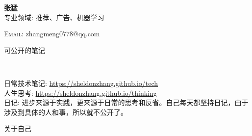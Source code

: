 \documentclass[20pt,a4paper]{article}
\newenvironment{changemargin}[2]{%
  \begin{list}{}{%
    \setlength{\topsep}{0pt}%
    \setlength{\leftmargin}{#1}%
    \setlength{\rightmargin}{#2}%
    \setlength{\listparindent}{\parindent}%
    \setlength{\itemindent}{\parindent}%
    \setlength{\parsep}{\parskip}%
  }%
  \item[]}{\end{list}
}
\newcommand{\lineover}{
	\begin{changemargin}{-0.05in}{-0.05in}
		\vspace*{-8pt}
		\hrulefill \\
		\vspace*{-2pt}
	\end{changemargin}
}
\newcommand{\header}[1]{
	\begin{changemargin}{-0.5in}{-0.5in}
		\scshape{#1}\\
  	\lineover
	\end{changemargin}
}
\newcommand{\contact}[4]{
	\begin{changemargin}{-0.5in}{-0.5in}
		\begin{center}
			{\large \scshape {#1}}\\ %
			{#2}\\ %
			{#3}\\ %
			{#4}%
		\end{center}
	\end{changemargin}
}
\newenvironment{body} {
	\vspace*{-16pt}
	\begin{changemargin}{-0.25in}{-0.5in}
  }	
	{\end{changemargin}
}
\begin{document}
\begin{minipage}[t]{0.5\textwidth}
\textbf{张猛} \\
\hfill 专业领域: 推荐、广告、机器学习\\
\end{minipage}
%
\begin{minipage}[t]{0.48\textwidth}
\textsc{Email:} zhangmeng0778@qq.com \\
\end{minipage}

\header{可公开的笔记}
\begin{body}
	\vspace{14pt}
	日常技术笔记: \url{https://sheldonzhang.github.io/tech} \\
	人生思考: \url{https://sheldonzhang.github.io/thinking} \\
	日记: 进步来源于实践，更来源于日常的思考和反省。自己每天都坚持日记，由于涉及到具体的人和事，所以就不公开了。
\end{body}

\header{关于自己}
\end{document}
